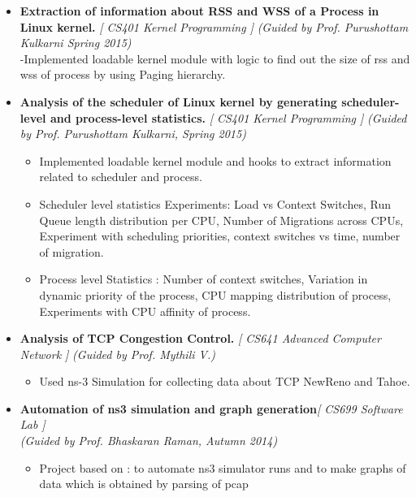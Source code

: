 \begin{itemize}
	\item \textbf{Extraction of information about RSS and WSS of a Process in Linux kernel.} \hfill \emph{[ CS401 Kernel Programming ]}\hfill 
	\emph{(Guided by Prof. Purushottam Kulkarni Spring 2015)} \\
	-Implemented loadable kernel module with logic to find out the size of rss and wss of process by using Paging hierarchy. \\[-0.6cm]
	\item \textbf{Analysis of the scheduler of Linux kernel by generating scheduler-level and process-level statistics.} \hfill \emph{[ CS401 Kernel Programming ]} \hfill
	\emph{(Guided by Prof. Purushottam Kulkarni, Spring 2015)}\hfill \\[-0.7cm]
	\begin{itemize}
	 \item Implemented loadable kernel module and hooks to extract information related to scheduler and process.\\[-0.6cm]
	 \item Scheduler level statistics Experiments: Load vs Context Switches, Run Queue length distribution per CPU, Number of Migrations across CPUs, Experiment with scheduling priorities, context switches vs time, number of migration.\\[-0.6cm]
	 \item Process level Statistics : Number of context switches, Variation in dynamic priority of the process, CPU mapping distribution of process, Experiments with CPU affinity of process.\\[-0.6cm]
	\end{itemize}
	\item \textbf{Analysis of TCP Congestion Control.} \hfill \emph{[ CS641 Advanced Computer Network ]} \emph{(Guided by Prof. Mythili V.)} \\[-0.6cm]
\begin{itemize}
	\item Used ns-3 Simulation for collecting data about TCP NewReno and Tahoe. 
\end{itemize}
	\item \textbf{Automation of ns3 simulation and graph generation}\hfill\emph{[ CS699 Software Lab ]}  \\
	\emph{(Guided by Prof. Bhaskaran Raman, Autumn 2014)}  \\[-0.6cm]
	\begin{itemize}
	 \item Project based on : to automate ns3 simulator runs and to make graphs of data which is obtained by parsing of pcap

\end{itemize}
\end{itemize}
